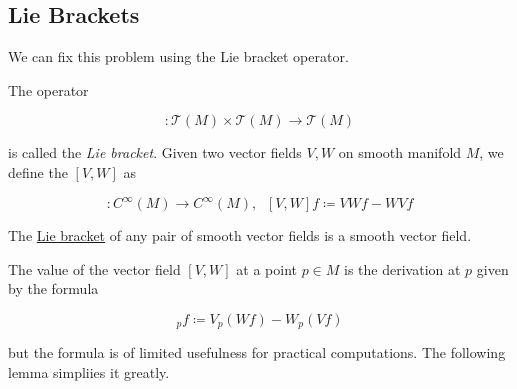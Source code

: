 \documentclass{article}
\newcounter{definition}[section]
\begin{document}
  \subsection{Lie Brackets}

    We can fix this problem using the Lie bracket operator. 

    \begin{definition}
      \label{def:lie-bracket}
    The operator 

      \begin{equation}
        [\cdot, \cdot]: \mathcal{T}(M) \times \mathcal{T} (M) \to \mathcal{T}(M)
      \end{equation}

    is called the \textit{Lie bracket}. Given two vector fields $V, W$ on smooth manifold $M$, we define the $[V, W]$ as 

      \begin{equation}
        [V, W]: C^\infty(M) \to C^\infty (M), \;\; [V, W] f \coloneqq V W f - W V f
      \end{equation}
    \end{definition}

    \begin{lemma}
      \label{thm:the-lie-bracket-of-smooth-fields-is-smooth}
      The \hyperref[def:lie-bracket]{Lie bracket} of any pair of smooth vector fields is a smooth vector field.
    \end{lemma}

    The value of the vector field $[V, W]$ at a point $p \in M$ is the derivation at $p$ given by the formula

      \begin{equation}
        [V, W]_p f \coloneqq V_p (W f) - W_p (V f)
      \end{equation}

    but the formula is of limited usefulness for practical computations. The following lemma simpliies it greatly. 
\end{document}
